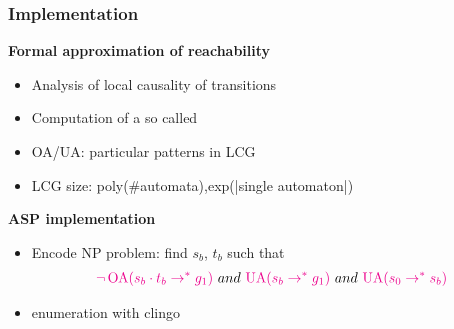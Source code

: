 \begin{frame}[c]
\frametitle{Implementation}
\textbf{Formal approximation of reachability}
\begin{itemize}
\item Analysis of local causality of transitions
\item Computation of a so called 
\item OA/UA: particular patterns in LCG
\item LCG size: poly(\#automata),exp(|single automaton|)
\end{itemize}
\bigskip
\textbf{ASP implementation}
\begin{itemize}
\item Encode NP problem: find $s_b$, $t_b$ such that
\begin{align*}
{\color{magenta} \neg \OA{s_b \cdot t_b}{g_1}} \ and\ {\color{magenta}\UA{s_b}{g_1}}\ and \  {\color{magenta}\UA{s_0}{s_b}}
\end{align*}
\item enumeration with clingo
\end{itemize}
\end{frame}



